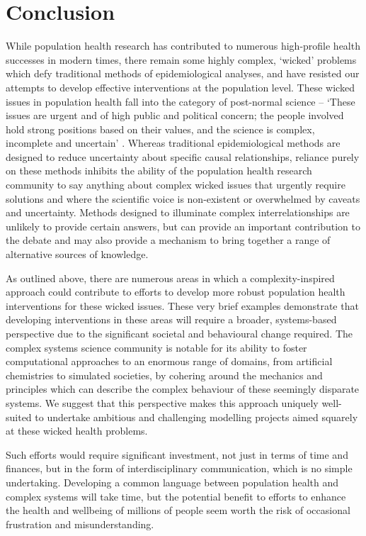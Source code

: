 \documentclass[review]{elsarticle}
\begin{document}
\section{Conclusion}

While population health research has contributed to numerous high-profile health successes in modern times, there remain some highly complex, `wicked' problems which defy traditional methods of epidemiological analyses, and have resisted our attempts to develop effective interventions at the population level.  These wicked issues in population health fall into the category of post-normal science -- `These issues are urgent and of high public and political concern; the people involved hold strong positions based on their values, and the science is complex, incomplete and uncertain' \citep[][p. 163]{gluckman2014}. Whereas traditional epidemiological methods are designed to reduce uncertainty about specific causal relationships, reliance purely on these methods inhibits the ability of the population health research community to say anything about complex wicked issues that urgently require solutions and where the scientific voice is non-existent or overwhelmed by caveats and uncertainty. Methods designed to illuminate complex interrelationships are unlikely to provide certain answers, but can provide an important contribution to the debate and may also provide a mechanism to bring together a range of alternative sources of knowledge. 

As outlined above, there are numerous areas in which a complexity-inspired approach could contribute to efforts to develop more robust population health interventions for these wicked issues.  These very brief examples demonstrate that developing interventions in these areas will require a broader, systems-based perspective due to the significant societal and behavioural change required.  The complex systems science community is notable for its ability to foster computational approaches to an enormous range of domains, from artificial chemistries to simulated societies, by cohering around the mechanics and principles which can describe the complex behaviour of these seemingly disparate systems.  We suggest that this perspective makes this approach uniquely well-suited to undertake ambitious and challenging modelling projects aimed squarely at these wicked health problems.

Such efforts would require significant investment, not just in terms of time and finances, but in the form of interdisciplinary communication, which is no simple undertaking.  Developing a common language between population health and complex systems will take time, but the potential benefit to efforts to enhance the health and wellbeing of millions of people seem worth the risk of occasional frustration and misunderstanding.
\end{document}
